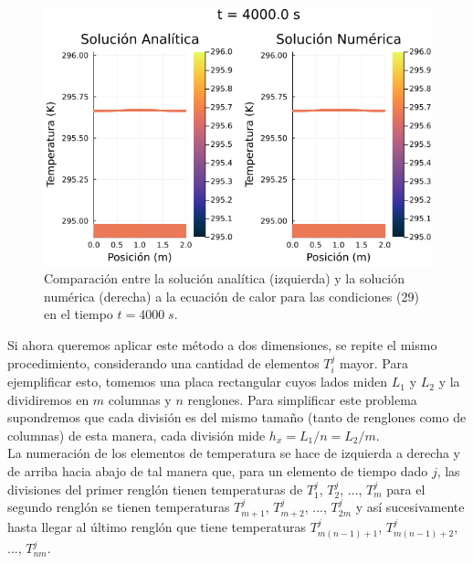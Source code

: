 \documentclass[12pt]{article}
\begin{document}
\begin{figure}[H]
\begin{center}
    \includegraphics[width=0.79\linewidth]{Ejemplo_02_t_6.png}
    \caption{Comparación entre la solución analítica (izquierda) y la solución numérica (derecha) a la ecuación de calor para las condiciones (29) en el tiempo $t=4000 \; s$.}
\end{center}
\end{figure}

Si ahora queremos aplicar este método a dos dimensiones, se repite el mismo procedimiento, considerando una cantidad de elementos $T_i^j$ mayor. Para ejemplificar esto, tomemos una placa rectangular cuyos lados miden $L_1$ y $L_2$ y la dividiremos en $m$ columnas y $n$ renglones. Para simplificar este problema supondremos que cada división es del mismo tamaño (tanto de renglones como de columnas) de esta manera, cada división mide $h_x = L_1/n = L_2/m$. \\

La numeración de los elementos de temperatura se hace de izquierda a derecha y de arriba hacia abajo de tal manera que, para un elemento de tiempo dado $j$, las divisiones del primer renglón tienen temperaturas de $T_1^j$, $T_2^j$, ..., $T_m^j$ para el segundo renglón se tienen temperaturas $T_{m+1}^j$, $T_{m+2}^j$, ..., $T_{2m}^j$ y así sucesivamente hasta llegar al último renglón que tiene temperaturas $T_{m(n-1)+1}^j$, $T_{m(n-1)+2}^j$, ..., $T_{nm}^j$.
\end{document}
